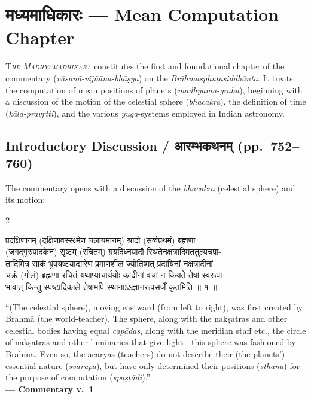 \documentclass[11pt,a4paper]{article}
\newcommand{\dev}[1]{{\devanagarifont #1}}
\newenvironment{bilingualverse}{%
  \begin{paracol}{2}
  \fontsize{10.5}{13}\selectfont
}{%
  \end{paracol}
  \vspace{0.3cm}
}
\begin{document}
\newpage

\section*{\dev{मध्यमाधिकारः} — Mean Computation Chapter}

\lettrine[lines=3,loversize=0.1]{T}{\textit{he Madhyamādhikāra}} constitutes the first and foundational chapter of the commentary (\textit{vāsanā-vijñāna-bhāṣya}) on the \textit{Brāhmasphuṭasiddhānta}. It treats the computation of mean positions of planets (\textit{madhyama-graha}), beginning with a discussion of the motion of the celestial sphere (\textit{bhacakra}), the definition of time (\textit{kāla-pravṛtti}), and the various \textit{yuga}-systems employed in Indian astronomy.

\subsection*{Introductory Discussion / \dev{आरम्भकथनम्} (pp.\ 752--760)}

The commentary opens with a discussion of the \textit{bhacakra} (celestial sphere) and its motion:

\begin{bilingualverse}
\begin{leftcolumn*}
\dev{प्रदक्षिणागम् (दक्षिणावस्स्क्ष्मेण चलायमानम्) श्रादो (सर्व्वप्रथमं) ब्रह्मणा}\\
\dev{(जगद्गुरुपादकेन) सृष्टम् (रचितम्) ग्रयदिध्नयादौ स्थितेनक्षत्रादिमततुल्यचपा-}\\
\dev{तादिमित्र साकं भ्रुवयष्ट्याद्यारेण प्रमाणशील ज्योतिष्मत् प्रदायिनां नक्षत्रादीनां}\\
\dev{चक्रं (गोलं) ब्रह्मणा रचितं यथाप्याचार्ययोः कादीनां वचां न कियते तेषां स्वरूपा-}\\
\dev{भावात् किन्तु स्पष्टादिकाले तेषामपि स्थानाऽऽज्ञानरूपसर्जें कृतमिति ॥ १ ॥}
\end{leftcolumn*}
\begin{rightcolumn}
``(The celestial sphere), moving eastward (from left to right), was first created by Brahmā (the world-teacher). The sphere, along with the nakṣatras and other celestial bodies having equal \textit{capādas}, along with the meridian staff etc., the circle of nakṣatras and other luminaries that give light---this sphere was fashioned by Brahmā. Even so, the ācāryas (teachers) do not describe their (the planets') essential nature (\textit{svārūpa}), but have only determined their positions (\textit{sthāna}) for the purpose of computation (\textit{spaṣṭādi}).''\\[0.3cm]
\hfill\textbf{— Commentary v.\ 1}
\end{rightcolumn}
\end{bilingualverse}
\end{document}
